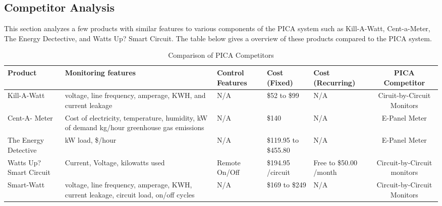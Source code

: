 \subsection{Competitor Analysis} %
This section analyzes a few products with similar features to various components of the PICA system such as Kill-A-Watt, Cent-a-Meter, The Energy Dectective, and Watts Up? Smart Circuit. The table below gives a overview of these products compared to the PICA system. %

\begin{table}[htdp]
\caption{Comparison of PICA Competitors}
\begin{center}
\begin{tabular}{|>{\centering}b{0.75in}|>{\raggedright}b{1.25in}|>{\raggedright}b{1in}|>{\raggedright}b{0.5in}|>{\raggedright}b{0.5in}|c|}\hline
\rowcolor{lightgray}Product & Monitoring features & Control Features & Cost (Fixed) & Cost (Recurring) & PICA Competitor\\\hline
Kill-A-Watt & voltage, line frequency, amperage, KWH, and current leakage & N/A & \$52 to \$99 & N/A & Ciruit-by-Circuit Monitors\\\hline 
Cent-A- Meter & Cost of electricity, temperature, humidity, kW of demand kg/hour greenhouse gas emissions & N/A & \$140 & N/A & E-Panel Meter\\\hline 
The Energy Detective & kW load, \$/hour & N/A & \$119.95 to \$455.80 & N/A & E-Panel Meter\\\hline
Watts Up? Smart Circuit & Current, Voltage, kilowatts used & Remote On/Off & \$194.95 /circuit & Free to \$50.00 /month & Circuit-by-Circuit monitors\\\hline
Smart-Watt & voltage, line frequency, amperage, KWH, current leakage, circuit load, on/off cycles & N/A & \$169 to \$249  & N/A & Circuit-by-Circuit Monitors\\\hline
\end{tabular}
\end{center}
\label{tab:competition_sum}
\end{table}%

